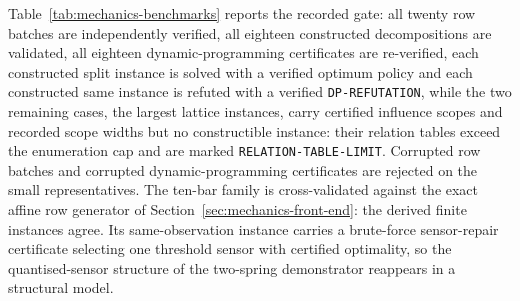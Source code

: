 \documentclass[11pt]{article}
\theoremstyle{plain}
\theoremstyle{definition}
\theoremstyle{remark}
\begin{document}
Table~\ref{tab:mechanics-benchmarks} reports the recorded gate: all twenty
row batches are independently verified, all eighteen constructed
decompositions are validated, all eighteen dynamic-programming certificates
are re-verified, each constructed split instance is solved with a verified
optimum policy and each constructed same instance is refuted with a verified
\texttt{DP-REFUTATION}, while the two remaining cases, the largest lattice
instances, carry certified influence scopes and recorded scope widths but no
constructible instance: their relation tables exceed the enumeration cap and
are marked
\texttt{RELATION-TABLE-LIMIT}.  Corrupted row batches and
corrupted dynamic-programming certificates are rejected on the small
representatives.  The ten-bar family is cross-validated against the exact
affine row generator of Section~\ref{sec:mechanics-front-end}: the derived
finite instances agree.  Its same-observation instance carries a brute-force
sensor-repair certificate selecting one threshold sensor with certified
optimality, so the quantised-sensor structure of the two-spring demonstrator
reappears in a structural model.
\end{document}
